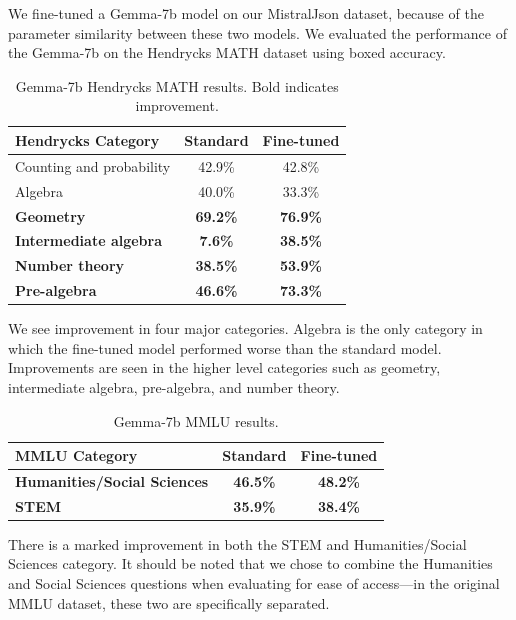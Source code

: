We fine-tuned a Gemma-7b model on our MistralJson dataset, because of the parameter similarity between these two models. We evaluated the performance of the Gemma-7b on the Hendrycks MATH dataset using boxed accuracy.

\begin{table}[h]
\centering
\begin{tabular}{lcc}
\toprule
\textbf{Hendrycks Category} & \textbf{Standard} & \textbf{Fine-tuned} \\
\midrule
Counting and probability & 42.9\% & 42.8\% \\
Algebra & 40.0\% & 33.3\% \\
\textbf{Geometry} & \textbf{69.2\%} & \textbf{76.9\%} \\
\textbf{Intermediate algebra} & \textbf{7.6\%} & \textbf{38.5\%} \\
\textbf{Number theory} & \textbf{38.5\%} & \textbf{53.9\%} \\
\textbf{Pre-algebra} & \textbf{46.6\%} & \textbf{73.3\%} \\
\bottomrule
\end{tabular}
\caption{Gemma-7b Hendrycks MATH results. Bold indicates improvement.}
\end{table}

We see improvement in four major categories. Algebra is the only category in which the fine-tuned model performed worse than the standard model. Improvements are seen in the higher level categories such as geometry, intermediate algebra, pre-algebra, and number theory.

\begin{table}[h]
\centering
\begin{tabular}{lcc}
\toprule
\textbf{MMLU Category} & \textbf{Standard} & \textbf{Fine-tuned} \\
\midrule
\textbf{Humanities/Social Sciences} & \textbf{46.5\%} & \textbf{48.2\%} \\
\textbf{STEM} & \textbf{35.9\%} & \textbf{38.4\%} \\
\bottomrule
\end{tabular}
\caption{Gemma-7b MMLU results.}
\end{table}

There is a marked improvement in both the STEM and Humanities/Social Sciences category. It should be noted that we chose to combine the Humanities and Social Sciences questions when evaluating for ease of access---in the original MMLU dataset, these two are specifically separated.

